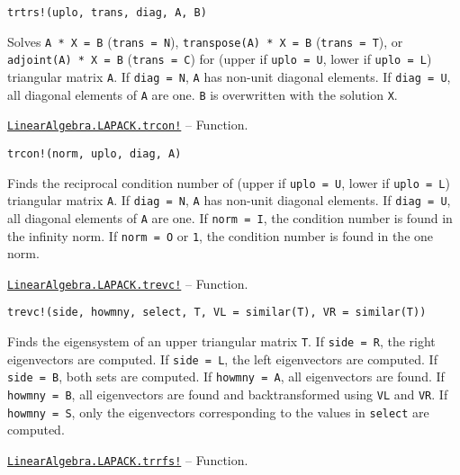 \begin{adjustwidth}{2em}{0pt}


\begin{verbatim}
trtrs!(uplo, trans, diag, A, B)
\end{verbatim}

Solves \texttt{A * X = B} (\texttt{trans = N}), \texttt{transpose(A) * X = B} (\texttt{trans = T}), or \texttt{adjoint(A) * X = B} (\texttt{trans = C}) for (upper if \texttt{uplo = U}, lower if \texttt{uplo = L}) triangular matrix \texttt{A}. If \texttt{diag = N}, \texttt{A} has non-unit diagonal elements. If \texttt{diag = U}, all diagonal elements of \texttt{A} are one. \texttt{B} is overwritten with the solution \texttt{X}.



\end{adjustwidth}
\hypertarget{9926413427788620088}{}
\hyperlink{9926413427788620088}{\texttt{LinearAlgebra.LAPACK.trcon!}}  -- {Function.}

\begin{adjustwidth}{2em}{0pt}


\begin{verbatim}
trcon!(norm, uplo, diag, A)
\end{verbatim}

Finds the reciprocal condition number of (upper if \texttt{uplo = U}, lower if \texttt{uplo = L}) triangular matrix \texttt{A}. If \texttt{diag = N}, \texttt{A} has non-unit diagonal elements. If \texttt{diag = U}, all diagonal elements of \texttt{A} are one. If \texttt{norm = I}, the condition number is found in the infinity norm. If \texttt{norm = O} or \texttt{1}, the condition number is found in the one norm.



\end{adjustwidth}
\hypertarget{7491620034849793338}{}
\hyperlink{7491620034849793338}{\texttt{LinearAlgebra.LAPACK.trevc!}}  -- {Function.}

\begin{adjustwidth}{2em}{0pt}


\begin{verbatim}
trevc!(side, howmny, select, T, VL = similar(T), VR = similar(T))
\end{verbatim}

Finds the eigensystem of an upper triangular matrix \texttt{T}. If \texttt{side = R}, the right eigenvectors are computed. If \texttt{side = L}, the left eigenvectors are computed. If \texttt{side = B}, both sets are computed. If \texttt{howmny = A}, all eigenvectors are found. If \texttt{howmny = B}, all eigenvectors are found and backtransformed using \texttt{VL} and \texttt{VR}. If \texttt{howmny = S}, only the eigenvectors corresponding to the values in \texttt{select} are computed.



\end{adjustwidth}
\hypertarget{17047065310014133867}{}
\hyperlink{17047065310014133867}{\texttt{LinearAlgebra.LAPACK.trrfs!}}  -- {Function.}

